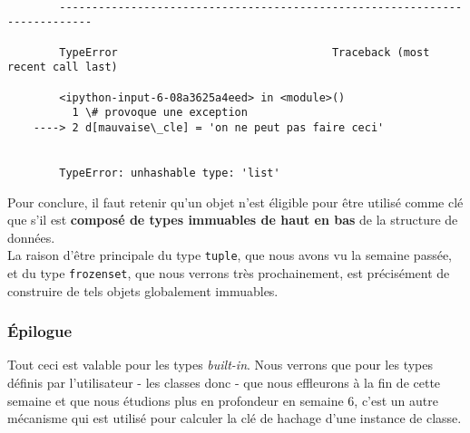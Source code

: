     \begin{Verbatim}[commandchars=\\\{\}]

        ---------------------------------------------------------------------------

        TypeError                                 Traceback (most recent call last)

        <ipython-input-6-08a3625a4eed> in <module>()
          1 \# provoque une exception
    ----> 2 d[mauvaise\_cle] = 'on ne peut pas faire ceci'
    

        TypeError: unhashable type: 'list'

    \end{Verbatim}

    Pour conclure, il faut retenir qu'un objet n'est éligible pour être
utilisé comme clé que s'il est \textbf{composé de types immuables de
haut en bas} de la structure de données.\\

    La raison d'être principale du type \texttt{tuple}, que nous avons vu la
semaine passée, et du type \texttt{frozenset}, que nous verrons très
prochainement, est précisément de construire de tels objets globalement
immuables.

    \hypertarget{uxe9pilogue}{%
\subsubsection{Épilogue}\label{uxe9pilogue}}

    Tout ceci est valable pour les types \emph{built-in}. Nous verrons que
pour les types définis par l'utilisateur - les classes donc - que nous
effleurons à la fin de cette semaine et que nous étudions plus en
profondeur en semaine 6, c'est un autre mécanisme qui est utilisé pour
calculer la clé de hachage d'une instance de classe.
